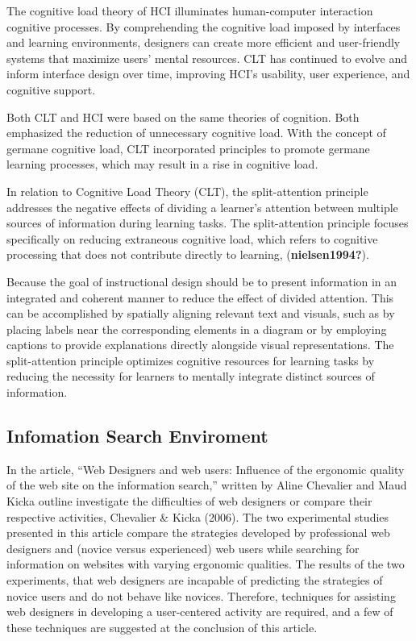 \documentclass[print]{nuthesis}
\begin{document}
The cognitive load theory of HCI illuminates human-computer interaction cognitive processes.
By comprehending the cognitive load imposed by interfaces and learning environments, designers can create more efficient and user-friendly systems that maximize users' mental resources.
CLT has continued to evolve and inform interface design over time, improving HCI's usability, user experience, and cognitive support.

Both CLT and HCI were based on the same theories of cognition.
Both emphasized the reduction of unnecessary cognitive load.
With the concept of germane cognitive load, CLT incorporated principles to promote germane learning processes, which may result in a rise in cognitive load.

In relation to Cognitive Load Theory (CLT), the split-attention principle addresses the negative effects of dividing a learner's attention between multiple sources of information during learning tasks.
The split-attention principle focuses specifically on reducing extraneous cognitive load, which refers to cognitive processing that does not contribute directly to learning, (\textbf{nielsen1994?}).

Because the goal of instructional design should be to present information in an integrated and coherent manner to reduce the effect of divided attention.
This can be accomplished by spatially aligning relevant text and visuals, such as by placing labels near the corresponding elements in a diagram or by employing captions to provide explanations directly alongside visual representations.
The split-attention principle optimizes cognitive resources for learning tasks by reducing the necessity for learners to mentally integrate distinct sources of information.

\hypertarget{infomation-search-enviroment}{%
\subsection{Infomation Search Enviroment}\label{infomation-search-enviroment}}

In the article, ``Web Designers and web users: Influence of the ergonomic quality of the web site on the information search,'' written by Aline Chevalier and Maud Kicka outline investigate the difficulties of web designers or compare their respective activities, Chevalier \& Kicka (2006).
The two experimental studies presented in this article compare the strategies developed by professional web designers and (novice versus experienced) web users while searching for information on websites with varying ergonomic qualities.
The results of the two experiments, that web designers are incapable of predicting the strategies of novice users and do not behave like novices.
Therefore, techniques for assisting web designers in developing a user-centered activity are required, and a few of these techniques are suggested at the conclusion of this article.
\end{document}
